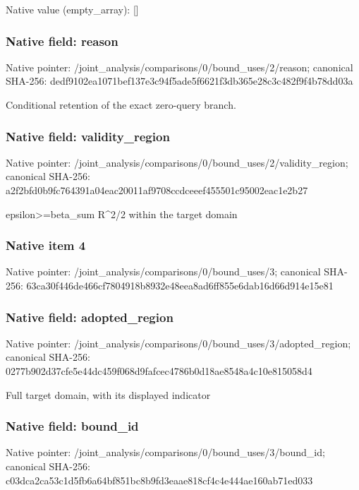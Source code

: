 \documentclass[10pt,a4paper]{article}
\begin{document}
Native value (empty\_\allowbreak{}array): []

\subsubsection{Native field: reason}
Native pointer: /joint\_\allowbreak{}analysis/comparisons/0/bound\_\allowbreak{}uses/2/reason; canonical SHA-256: dedf9102ea1071bef137e3c94f5ade5f6621f3db365e28c3c482f9f4b78dd03a

\begingroup\raggedright\sloppy Conditional retention of the exact zero-query branch.\par\endgroup

\subsubsection{Native field: validity\_\allowbreak{}region}
Native pointer: /joint\_\allowbreak{}analysis/comparisons/0/bound\_\allowbreak{}uses/2/validity\_\allowbreak{}region; canonical SHA-256: a2f2bfd0b9fc764391a04eac20011af9708ccdceeef455501c95002eac1e2b27

\begingroup\raggedright\sloppy epsilon>=\allowbreak{}beta\_\allowbreak{}sum R\textasciicircum{}2/\allowbreak{}2 within the target domain\par\endgroup

\subsubsection{Native item 4}
Native pointer: /joint\_\allowbreak{}analysis/comparisons/0/bound\_\allowbreak{}uses/3; canonical SHA-256: 63ca30f446de466cf7804918b8932e48eea8ad6ff855e6dab16d66d914e15e81

\subsubsection{Native field: adopted\_\allowbreak{}region}
Native pointer: /joint\_\allowbreak{}analysis/comparisons/0/bound\_\allowbreak{}uses/3/adopted\_\allowbreak{}region; canonical SHA-256: 0277b902d37cfe5e44dc459f068d9fafcec4786b0d18ae8548a4c10e815058d4

\begingroup\raggedright\sloppy Full target domain,\allowbreak{} with its displayed indicator\par\endgroup

\subsubsection{Native field: bound\_\allowbreak{}id}
Native pointer: /joint\_\allowbreak{}analysis/comparisons/0/bound\_\allowbreak{}uses/3/bound\_\allowbreak{}id; canonical SHA-256: c03dca2ca53c1d5fb6a64bf851bc8b9fd3eaae818cf4c4e444ae160ab71ed033
\end{document}
